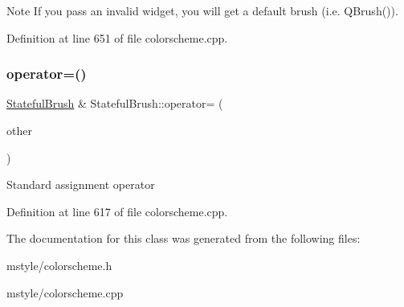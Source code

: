 \begin{DoxyNote}{Note}
If you pass an invalid widget, you will get a default brush (i.\+e. {\ttfamily Q\+Brush()}). 
\end{DoxyNote}


Definition at line 651 of file colorscheme.\+cpp.

\mbox{\label{class_stateful_brush_a9c97dd9059e6160632611e3484a58219}} 
\subsubsection{\texorpdfstring{operator=()}{operator=()}}
{\footnotesize\ttfamily \hyperlink{class_stateful_brush}{Stateful\+Brush} \& Stateful\+Brush\+::operator= (\begin{DoxyParamCaption}\item[{const \hyperlink{class_stateful_brush}{Stateful\+Brush} \&}]{other }\end{DoxyParamCaption})}

Standard assignment operator 

Definition at line 617 of file colorscheme.\+cpp.



The documentation for this class was generated from the following files\+:\begin{DoxyCompactItemize}
\item 
mstyle/colorscheme.\+h\item 
mstyle/colorscheme.\+cpp\end{DoxyCompactItemize}
